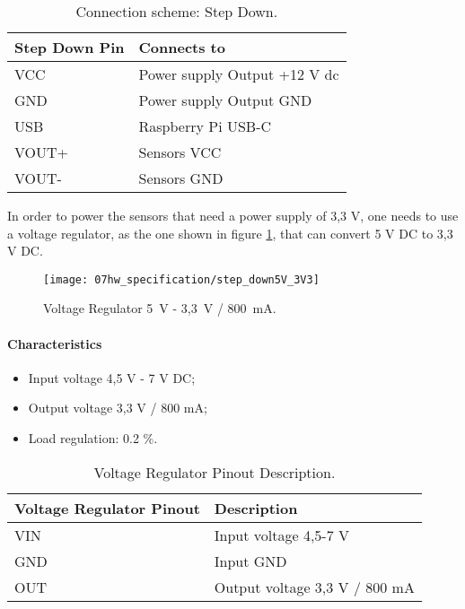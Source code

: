 \begin{table}[H]
	\centering
	\begin{tabular}{|m{5cm}|m{6cm}|}
		\hline
		\textbf{Step Down Pin} & \textbf{Connects to}
		\\\hline\hline
		
		VCC & Power supply Output +12 V \ac{dc}
		\\\hline
		GND & Power supply Output GND
		\\\hline
		USB & Raspberry Pi USB-C
		\\\hline
		VOUT+ & Sensors VCC
		\\\hline
		VOUT- & Sensors GND
		\\\hline
	\end{tabular}
	
	\caption{Connection scheme: Step Down.}
	\label{table:connect_power}
\end{table}

In order to power the sensors that need a power supply of 3,3 V, one needs to use a voltage regulator, as the one shown in figure \ref{fig:volReg}, that can convert 5 V DC to 3,3 V DC. \cite{stepDown5_3V3}

\begin{figure}[H]
	\centering
	\texttt{[image: 07hw\_specification/step\_down5V\_3V3]}
	\caption{Voltage Regulator 5~V - 3,3~V / 800~mA.}
	\label{fig:volReg}
\end{figure}

\paragraph*{Characteristics}
\begin{itemize}
	\item Input voltage 4,5 V - 7 V DC;
	\item Output voltage 3,3 V / 800 mA;
	\item Load regulation: 0.2 \%.
\end{itemize}

\begin{table}[H]
	\centering
	\begin{tabular}{|m{5cm}|m{6cm}|}
		\hline
		\textbf{Voltage Regulator Pinout} & \textbf{Description}
		\\\hline\hline
		
		VIN & Input voltage 4,5-7 V
		\\\hline
		GND & Input GND
		\\\hline
		OUT & Output voltage 3,3 V / 800 mA
		\\\hline
	\end{tabular}
	
	\caption{Voltage Regulator Pinout Description.}
	\label{table:voltRegPinout}
\end{table}

